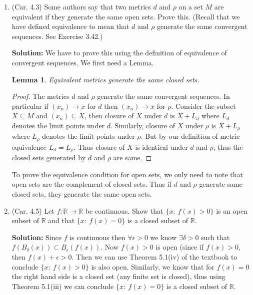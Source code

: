 \documentclass{article}
\newtheorem{lem}{Lemma}
\def\to{\rightarrow}
\def\RR{\mathbb R}
\begin{document}
\begin{enumerate}


\item (Car. 4.3) Some authors say that two metrics $d$ and $\rho$ on a set $M$ are equivalent if they generate the same open sets. Prove this. (Recall that we have defined equivalence to mean that $d$ and $\rho$ generate the same convergent sequences. See Exercise 3.42.)

\textbf{Solution:} We have to prove this using the definition of equivalence of convergent sequences.
We first need a Lemma.
\begin{lem}
Equivalent metrics generate the same closed sets.
\end{lem}
\begin{proof}
The metrics $d$ and $\rho$ generate the same convergent sequences. In particular if $(x_n) \rightarrow x$ for
$d$ then $(x_n) \rightarrow x$ for $\rho$. Consider the subset $X \subseteq M$ and $(x_n) \subseteq X$, then
closure of $X$ under $d$ is $X+L_d$ where $L_d$ denotes the limit points under $d$. Similarly, closure of
$X$ under $\rho$ is $X+L_\rho$ where $L_\rho$ denotes the limit points under $\rho$. But by our definition
of metric equivalence $L_d = L_\rho$. Thus closure of $X$ is identical under $d$ and $\rho$, thus the
closed sets generated by $d$ and $\rho$ are same.
\end{proof}
To prove the equivalence condition for open sets, we only need to note that open sets are the complement of
closed sets. Thus if $d$ and $\rho$ generate same closed sets, they generate the same open sets.

\item (Car. 4.5) Let $f: \RR \to \RR$ be continuous. Show that $\{ x :\ f(x) > 0 \}$ is an open subset of $\RR$ and that $\{x:\ f(x) = 0 \}$ is a closed subset of $\RR$.

\textbf{Solution:} Since $f$ is continuous then $\forall \epsilon > 0$ we know $\exists \delta > 0$ such that
$f(B_\delta(x)) \subset B_\epsilon(f(x))$. Now $f(x) > 0$ is open (since if $f(x) > 0$, then $f(x)+\epsilon > 0$.
Then we can use Theorem 5.1(iv) of the textbook to conclude $\{ x :\ f(x) > 0 \}$ is also open.
Similarly, we know that for $f(x)=0$ the right hand side is a closed set (any finite set is closed), thus
using Theorem 5.1(iii) we can conclude $\{x:\ f(x) = 0 \}$ is a closed subset of $\RR$.


\end{enumerate}
\end{document}
